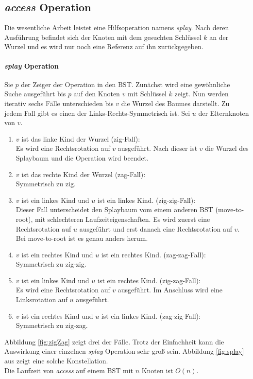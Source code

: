 \documentclass[a4paper,12pt]{article}
\begin{document}
\subsection{\textit{access} Operation }
Die wesentliche Arbeit leistet eine Hilfsoperation namens \textit{splay}. Nach deren Ausführung befindet sich der Knoten mit dem gesuchten Schlüssel $k$ an der Wurzel und es wird nur noch eine Referenz auf ihn zurückgegeben.

\paragraph{\textit{splay} Operation}
Sie $p$ der Zeiger der Operation in den BST. Zunächst wird eine gewöhnliche Suche ausgeführt bis $p$ auf den Knoten $v$ mit Schlüssel $k$ zeigt. Nun werden iterativ sechs Fälle unterschieden bis $v$ die Wurzel des Baumes darstellt. Zu jedem Fall gibt es einen der Links-Rechts-Symmetrisch ist. Sei $u$ der Elternknoten von $v$. 

\begin{enumerate}
	\item $v$ ist das linke Kind der Wurzel (zig-Fall):\\
	Es wird eine Rechtsrotation auf $v$ ausgeführt. Nach dieser ist $v$ die Wurzel des Splaybaum und die Operation wird beendet. 
	\item $v$ ist das rechte Kind der Wurzel (zag-Fall):\\
	Symmetrisch zu zig.
	\item $v$ ist ein linkes Kind und $u$ ist ein linkes Kind. (zig-zig-Fall):\\
	Dieser Fall unterscheidet den Splaybaum vom einem anderen BST (move-to-root), mit schlechteren Laufzeiteigenschaften. Es wird zuerst eine Rechtsrotation auf $u$ ausgeführt und erst danach eine Rechtsrotation auf $v$. Bei move-to-root  ist es genau anders herum. 
	\item $v$ ist ein rechtes Kind und $u
	$ ist ein rechtes Kind. (zag-zag-Fall):\\
	Symmetrisch zu zig-zig.
	\item $v$ ist ein linkes Kind und $u$ ist ein rechtes Kind. (zig-zag-Fall):\\
	Es wird eine Rechtsrotation auf $v$ ausgeführt. Im Anschluss wird eine Linksrotation auf $u$ ausgeführt.
	\item $v$ ist ein rechtes Kind und $u$ ist ein linkes Kind. (zag-zig-Fall):\\
	Symmetrisch zu zig-zag.
	
\end{enumerate}
Abbildung  \ref{fig:zigZag} zeigt drei der Fälle. Trotz der Einfachheit kann die Auswirkung einer einzelnen \textit{splay} Operation sehr groß sein. Abbildung \ref{fig:splay} aus \cite{splay} zeigt eine solche Konstellation. \\
Die Laufzeit von \textit{access} auf einem BST mit $n$ Knoten ist $O\left(n\right)$.
\end{document}
